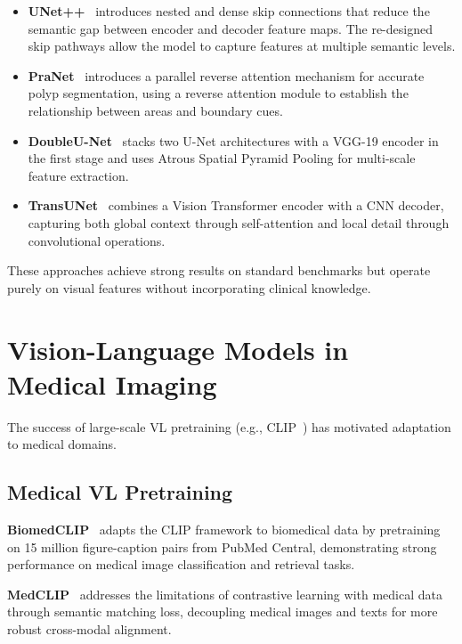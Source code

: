 \begin{itemize}
	\item \textbf{UNet++}~\cite{zhou2018unetplusplus} introduces nested and dense skip connections that reduce the semantic gap between encoder and decoder feature maps. The re-designed skip pathways allow the model to capture features at multiple semantic levels.
	
	\item \textbf{PraNet}~\cite{fan2020pranet} introduces a parallel reverse attention mechanism for accurate polyp segmentation, using a reverse attention module to establish the relationship between areas and boundary cues.
	
	\item \textbf{DoubleU-Net}~\cite{jha2020doubleunet} stacks two U-Net architectures with a VGG-19 encoder in the first stage and uses Atrous Spatial Pyramid Pooling for multi-scale feature extraction.
	
	\item \textbf{TransUNet}~\cite{chen2021transunet} combines a Vision Transformer encoder with a CNN decoder, capturing both global context through self-attention and local detail through convolutional operations.
\end{itemize}

These approaches achieve strong results on standard benchmarks but operate purely on visual features without incorporating clinical knowledge.


\section{Vision-Language Models in Medical Imaging}
\label{sec:rw:vlmedical}

The success of large-scale \ac{VL} pretraining (e.g., CLIP~\cite{radford2021clip}) has motivated adaptation to medical domains.

\subsection{Medical VL Pretraining}
\label{sec:rw:vlpretrain}

\textbf{BiomedCLIP}~\cite{zhang2023biomedclip} adapts the CLIP framework to biomedical data by pretraining on 15 million figure-caption pairs from PubMed Central, demonstrating strong performance on medical image classification and retrieval tasks.

\textbf{MedCLIP}~\cite{wang2022medclip} addresses the limitations of contrastive learning with medical data through semantic matching loss, decoupling medical images and texts for more robust cross-modal alignment.

